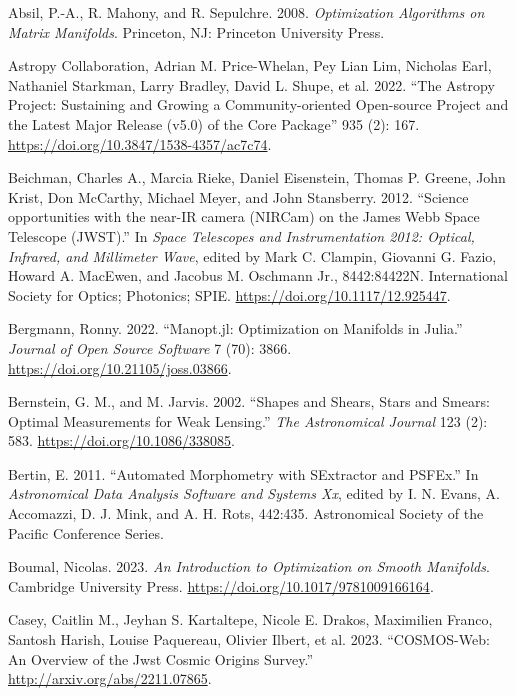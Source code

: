\documentclass[10pt,a4paper,onecolumn]{article}
\begin{document}
\hypertarget{refs}{}
\begin{cslreferences}
\leavevmode\hypertarget{ref-AbsMahSep2008}{}%
Absil, P.-A., R. Mahony, and R. Sepulchre. 2008. \emph{Optimization
Algorithms on Matrix Manifolds}. Princeton, NJ: Princeton University
Press.

\leavevmode\hypertarget{ref-2022ApJ}{}%
Astropy Collaboration, Adrian M. Price-Whelan, Pey Lian Lim, Nicholas
Earl, Nathaniel Starkman, Larry Bradley, David L. Shupe, et al. 2022.
``The Astropy Project: Sustaining and Growing a Community-oriented
Open-source Project and the Latest Major Release (v5.0) of the Core
Package'' 935 (2): 167. \url{https://doi.org/10.3847/1538-4357/ac7c74}.

\leavevmode\hypertarget{ref-10.1117ux2f12.925447}{}%
Beichman, Charles A., Marcia Rieke, Daniel Eisenstein, Thomas P. Greene,
John Krist, Don McCarthy, Michael Meyer, and John Stansberry. 2012.
``Science opportunities with the near-IR camera (NIRCam) on the James
Webb Space Telescope (JWST).'' In \emph{Space Telescopes and
Instrumentation 2012: Optical, Infrared, and Millimeter Wave}, edited by
Mark C. Clampin, Giovanni G. Fazio, Howard A. MacEwen, and Jacobus M.
Oschmann Jr., 8442:84422N. International Society for Optics; Photonics;
SPIE. \url{https://doi.org/10.1117/12.925447}.

\leavevmode\hypertarget{ref-Bergmann2022}{}%
Bergmann, Ronny. 2022. ``Manopt.jl: Optimization on Manifolds in
Julia.'' \emph{Journal of Open Source Software} 7 (70): 3866.
\url{https://doi.org/10.21105/joss.03866}.

\leavevmode\hypertarget{ref-Bernstein_2002}{}%
Bernstein, G. M., and M. Jarvis. 2002. ``Shapes and Shears, Stars and
Smears: Optimal Measurements for Weak Lensing.'' \emph{The Astronomical
Journal} 123 (2): 583. \url{https://doi.org/10.1086/338085}.

\leavevmode\hypertarget{ref-2011ASPC}{}%
Bertin, E. 2011. ``Automated Morphometry with SExtractor and PSFEx.'' In
\emph{Astronomical Data Analysis Software and Systems Xx}, edited by I.
N. Evans, A. Accomazzi, D. J. Mink, and A. H. Rots, 442:435.
Astronomical Society of the Pacific Conference Series.

\leavevmode\hypertarget{ref-boumal2023intromanifolds}{}%
Boumal, Nicolas. 2023. \emph{An Introduction to Optimization on Smooth
Manifolds}. Cambridge University Press.
\url{https://doi.org/10.1017/9781009166164}.

\leavevmode\hypertarget{ref-casey2023cosmosweb}{}%
Casey, Caitlin M., Jeyhan S. Kartaltepe, Nicole E. Drakos, Maximilien
Franco, Santosh Harish, Louise Paquereau, Olivier Ilbert, et al. 2023.
``COSMOS-Web: An Overview of the Jwst Cosmic Origins Survey.''
\url{http://arxiv.org/abs/2211.07865}.


\end{cslreferences}
\end{document}
